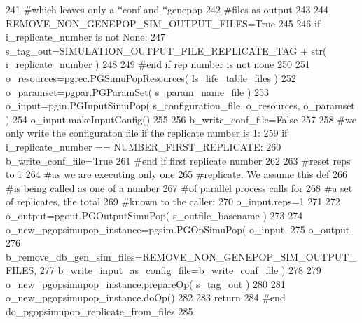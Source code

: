 \begin{DoxyCode}
241     \textcolor{comment}{#which leaves only a *conf and *genepop}
242     \textcolor{comment}{#files as output}
243 
244     REMOVE\_NON\_GENEPOP\_SIM\_OUTPUT\_FILES=\textcolor{keyword}{True}
245 
246     \textcolor{keywordflow}{if} i\_replicate\_number \textcolor{keywordflow}{is} \textcolor{keywordflow}{not} \textcolor{keywordtype}{None}:
247         s\_tag\_out=SIMULATION\_OUTPUT\_FILE\_REPLICATE\_TAG + str( i\_replicate\_number )
248 
249     \textcolor{comment}{#end if rep number is not none}
250 
251     o\_resources=pgrec.PGSimuPopResources( ls\_life\_table\_files )
252     o\_paramset=pgpar.PGParamSet( s\_param\_name\_file )
253     o\_input=pgin.PGInputSimuPop( s\_configuration\_file, o\_resources, o\_paramset ) 
254     o\_input.makeInputConfig()
255 
256     b\_write\_conf\_file=\textcolor{keyword}{False}
257 
258     \textcolor{comment}{#we only write the configuraton file if the replicate number is 1:}
259     \textcolor{keywordflow}{if} i\_replicate\_number == NUMBER\_FIRST\_REPLICATE:
260         b\_write\_conf\_file=\textcolor{keyword}{True}
261     \textcolor{comment}{#end if first replicate number}
262 
263     \textcolor{comment}{#reset reps to 1}
264     \textcolor{comment}{#as we are executing only one}
265     \textcolor{comment}{#replicate.  We assume this def}
266     \textcolor{comment}{#is being called as one of a number}
267     \textcolor{comment}{#of parallel process calls for}
268     \textcolor{comment}{#a set of replicates, the total }
269     \textcolor{comment}{#known to the caller:}
270     o\_input.reps=1
271 
272     o\_output=pgout.PGOutputSimuPop( s\_outfile\_basename )
273 
274     o\_new\_pgopsimupop\_instance=pgsim.PGOpSimuPop( o\_input,
275             o\_output, 
276             b\_remove\_db\_gen\_sim\_files=REMOVE\_NON\_GENEPOP\_SIM\_OUTPUT\_FILES,
277             b\_write\_input\_as\_config\_file=b\_write\_conf\_file )
278 
279     o\_new\_pgopsimupop\_instance.prepareOp( s\_tag\_out  )
280 
281     o\_new\_pgopsimupop\_instance.doOp()
282 
283     \textcolor{keywordflow}{return}
284 \textcolor{comment}{#end do\_pgopsimupop\_replicate\_from\_files}
285 
\end{DoxyCode}
